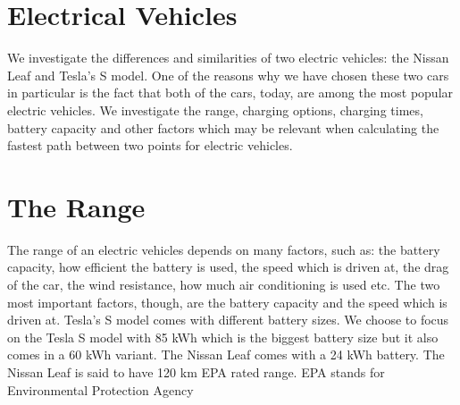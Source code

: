 
\section{Electrical Vehicles}

We investigate the differences and similarities of two electric vehicles: the Nissan Leaf and Tesla's S model. 
One of the reasons why we have chosen these two cars in particular is the fact that both of the cars, today, 
are among the most popular electric vehicles. We investigate the range, charging options, charging times, 
battery capacity and other factors which may be relevant when calculating the fastest path between two points for 
electric vehicles.

\section{The Range}

The range of an electric vehicles depends on many factors, such as: the battery capacity, how efficient the battery
is used, the speed which is driven at, the drag of the car, the wind resistance, how much air conditioning is 
used etc. The two most important factors, though, are the battery capacity and the speed which is driven at. 
Tesla's S model comes with different battery sizes. We choose to focus on the Tesla S model with 85 kWh which is 
the biggest battery size but it also comes in a 60 kWh variant. The Nissan Leaf comes with a 24 kWh battery. The 
Nissan Leaf is said to have 120 km EPA rated range. EPA stands for Environmental Protection Agency 